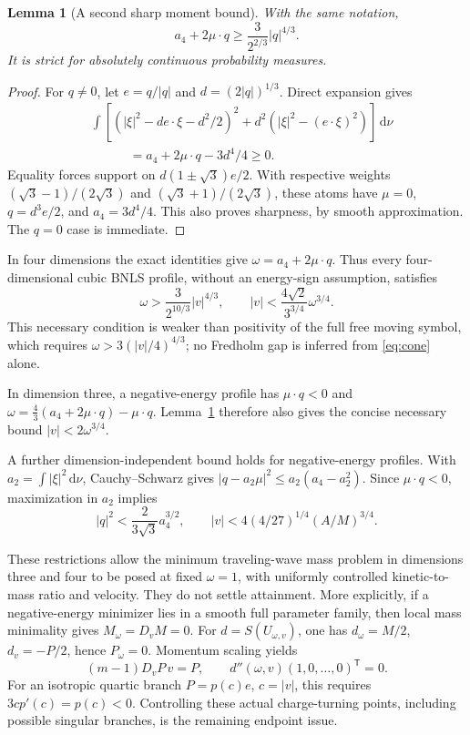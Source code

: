 \documentclass[11pt]{article}
\newtheorem{lemma}[theorem]{Lemma}
\theoremstyle{definition}
\theoremstyle{remark}
\newcommand{\dd}{\,\mathrm d}
\begin{document}
\begin{lemma}[A second sharp moment bound]\label{lem:momenttwo}
With the same notation,
\begin{equation}\label{eq:momenttwo}
 a_4+2\mu\cdot q\ge\frac3{2^{2/3}}|q|^{4/3}.
\end{equation}
It is strict for absolutely continuous probability measures.
\end{lemma}
\begin{proof}
For $q\ne0$, let $e=q/|q|$ and $d=(2|q|)^{1/3}$. Direct expansion gives
\begin{align*}
 &\int\left[(|\xi|^2-d e\cdot\xi-d^2/2)^2
                  +d^2(|\xi|^2-(e\cdot\xi)^2)\right]\dd\nu\\
 &\hspace{3em}=a_4+2\mu\cdot q-3d^4/4\ge0.
\end{align*}
Equality forces support on $d(1\pm\sqrt3)e/2$. With respective weights $(\sqrt3-1)/(2\sqrt3)$ and $(\sqrt3+1)/(2\sqrt3)$, these atoms have $\mu=0$, $q=d^3e/2$, and $a_4=3d^4/4$. This also proves sharpness, by smooth approximation. The $q=0$ case is immediate.
\end{proof}

In four dimensions the exact identities give $\omega=a_4+2\mu\cdot q$. Thus every four-dimensional cubic BNLS profile, without an energy-sign assumption, satisfies
\begin{equation}\label{eq:cone}
 \omega>\frac3{2^{10/3}}|v|^{4/3},\qquad
 |v|<\frac{4\sqrt2}{3^{3/4}}\omega^{3/4}.
\end{equation}
This necessary condition is weaker than positivity of the full free moving symbol, which requires $\omega>3(|v|/4)^{4/3}$; no Fredholm gap is inferred from \eqref{eq:cone} alone.

In dimension three, a negative-energy profile has $\mu\cdot q<0$ and $\omega=\tfrac43(a_4+2\mu\cdot q)-\mu\cdot q$. Lemma~\ref{lem:momenttwo} therefore also gives the concise necessary bound $|v|<2\omega^{3/4}$.

A further dimension-independent bound holds for negative-energy profiles. With $a_2=\int|\xi|^2\dd\nu$, Cauchy--Schwarz gives $|q-a_2\mu|^2\le a_2(a_4-a_2^2)$. Since $\mu\cdot q<0$, maximization in $a_2$ implies
\[
 |q|^2<\frac2{3\sqrt3}a_4^{3/2},\qquad
 |v|<4(4/27)^{1/4}(A/M)^{3/4}.
\]

These restrictions allow the minimum traveling-wave mass problem in dimensions three and four to be posed at fixed $\omega=1$, with uniformly controlled kinetic-to-mass ratio and velocity. They do not settle attainment. More explicitly, if a negative-energy minimizer lies in a smooth full parameter family, then local mass minimality gives $M_\omega=D_vM=0$. For $d=S(U_{\omega,v})$, one has $d_\omega=M/2$, $d_v=-P/2$, hence $P_\omega=0$. Momentum scaling yields
\[
 (m-1)D_vP\,v=P,\qquad d''(\omega,v)(1,0,\ldots,0)^{\mathsf T}=0.
\]
For an isotropic quartic branch $P=p(c)e$, $c=|v|$, this requires $3cp'(c)=p(c)<0$. Controlling these actual charge-turning points, including possible singular branches, is the remaining endpoint issue.
\end{document}
